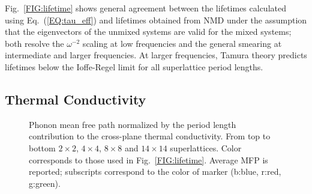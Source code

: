 \documentclass[aps,prb,preprint,preprintnumbers,amsmath,amssymb,floatfix,superscriptaddress]{revtex4}
\newcommand{\kv}{\mspace{-4.0mu}\left(\mspace{-8.0mu}
\begin{smallmatrix}&\pmb{\kappa} \\&\nu\end{smallmatrix}
\mspace{-3.0mu}\right)}
\begin{document}
Fig.~\ref{FIG:lifetime} shows general agreement between the lifetimes calculated using Eq.~(\ref{EQ:tau_eff}) and lifetimes obtained from NMD under the assumption that the eigenvectors of the unmixed systems are valid for the mixed systems; both resolve the $\omega^{-2}$ scaling at low frequencies and the general smearing at intermediate and larger frequencies. At larger frequencies, Tamura theory predicts lifetimes below the Ioffe-Regel limit for all superlattice period lengths.
\begin{comment}
\begin{table}
\begin{center}
\begin{tabular*}{\textwidth}{c@{\extracolsep{\fill}}ccccc}
\hline\hline\noalign{\smallskip}
&\multicolumn{3}{c}{$N\times N$ Superlattice} \\
\cline{2-5}\noalign{\smallskip}
\hspace{1cm} & $2\times2$ & $4\times4$ & $8\times8$ & $14\times14$  \\
\noalign{\smallskip}\hline\noalign{\smallskip}
RMSE $\sqrt{\frac{\sum_{\pmb{\kappa}\nu}(\tau_{eff}\kv-\tau_{mixed}\kv)^2}{n}}$ &0.65 & 1.21 & 2.09 & 5.42\\
Mean $\overline{\tau_{mixed}\kv}$ &1.37 & 1.93 & 2.74 & 3.40\\
Standard Deviation $\sigma[\tau_{mixed}\kv]$ &2.34 & 2.66 & 5.53 & 11.84\\
\noalign{\smallskip}\hline\hline
\end{tabular*}
\end{center}
\renewcommand{\table}{Table.}
\caption{The root-mean-square error between Tamura theory effective lifetimes and NMD mixed lifetimes. The mean and standard deviation of the NMD mixed lifetimes are provided for context. %
}
\label{TB:taud}
\end{table}
\end{comment}

\subsection{Thermal Conductivity}

\begin{figure}%
\begin{center}
\renewcommand{\figure}{Fig.}
\caption{Phonon mean free path normalized by the period length contribution to the cross-plane thermal conductivity. From top to bottom $2\times2$, $4\times4$, $8\times8$ and $14\times14$ superlattices. Color corresponds to those used in Fig.~\ref{FIG:lifetime}. Average MFP is reported; subscripts correspond to the color of marker (b:blue, r:red, g:green).}
\label{FIG:MFP_cp}
\end{center}
\end{figure}
\end{document}
